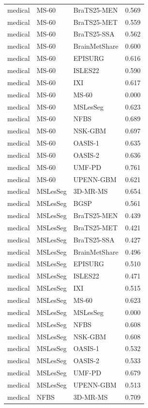 \begin{tabular}{lllr}
medical & MS-60 & BraTS25-MEN & 0.569 \\
medical & MS-60 & BraTS25-MET & 0.559 \\
medical & MS-60 & BraTS25-SSA & 0.562 \\
medical & MS-60 & BrainMetShare & 0.600 \\
medical & MS-60 & EPISURG & 0.616 \\
medical & MS-60 & ISLES22 & 0.590 \\
medical & MS-60 & IXI & 0.617 \\
medical & MS-60 & MS-60 & 0.000 \\
medical & MS-60 & MSLesSeg & 0.623 \\
medical & MS-60 & NFBS & 0.689 \\
medical & MS-60 & NSK-GBM & 0.697 \\
medical & MS-60 & OASIS-1 & 0.635 \\
medical & MS-60 & OASIS-2 & 0.636 \\
medical & MS-60 & UMF-PD & 0.761 \\
medical & MS-60 & UPENN-GBM & 0.621 \\
medical & MSLesSeg & 3D-MR-MS & 0.654 \\
medical & MSLesSeg & BGSP & 0.561 \\
medical & MSLesSeg & BraTS25-MEN & 0.439 \\
medical & MSLesSeg & BraTS25-MET & 0.421 \\
medical & MSLesSeg & BraTS25-SSA & 0.427 \\
medical & MSLesSeg & BrainMetShare & 0.496 \\
medical & MSLesSeg & EPISURG & 0.510 \\
medical & MSLesSeg & ISLES22 & 0.471 \\
medical & MSLesSeg & IXI & 0.515 \\
medical & MSLesSeg & MS-60 & 0.623 \\
medical & MSLesSeg & MSLesSeg & 0.000 \\
medical & MSLesSeg & NFBS & 0.608 \\
medical & MSLesSeg & NSK-GBM & 0.608 \\
medical & MSLesSeg & OASIS-1 & 0.532 \\
medical & MSLesSeg & OASIS-2 & 0.533 \\
medical & MSLesSeg & UMF-PD & 0.679 \\
medical & MSLesSeg & UPENN-GBM & 0.513 \\
medical & NFBS & 3D-MR-MS & 0.709 \\

\end{tabular}
